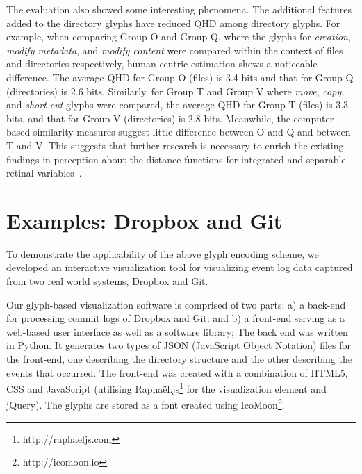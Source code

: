 The evaluation also showed some interesting phenomena.
The additional features added to the directory glyphs have reduced QHD among directory glyphs.
For example, when comparing Group O and Group Q, where the glyphs for \emph{creation}, \emph{modify metadata}, and \emph{modify content} were compared within the context of files and directories respectively, human-centric estimation shows a noticeable difference.
The average QHD for Group O (files) is 3.4 bits and that for Group Q (directories) is 2.6 bits.
Similarly, for Group T and Group V where \emph{move}, \emph{copy}, and \emph{short cut} glyphs were compared, the average QHD for Group T (files) is 3.3 bits, and that for Group V (directories) is 2.8 bits.
Meanwhile, the computer-based similarity measures suggest little difference between O and Q and between T and V.
This suggests that further research is necessary to enrich the existing findings in perception about the distance functions for integrated and separable retinal variables~\cite{Maguire:2012:TVCG}.

\section{Examples: Dropbox and Git}
\label{sec:application}

To demonstrate the applicability of the above glyph encoding scheme, we developed an interactive visualization tool for visualizing event log data captured from two real world systems, Dropbox and Git.

Our glyph-based visualization software is comprised of two parts:
a) a back-end for processing commit logs of Dropbox and Git; and
b) a front-end serving as a web-based user interface as well as a software library;
The back end was written in Python.
It generates two types of JSON (JavaScript Object Notation) files for the front-end, one describing the directory structure and the other describing the events that occurred.
The front-end was created with a combination of HTML5, CSS and JavaScript (utilising Rapha\"{e}l.js\footnote{http://raphaeljs.com} for the visualization element and jQuery).
The glyphs are stored as a font created using IcoMoon\footnote{http://icomoon.io}.

